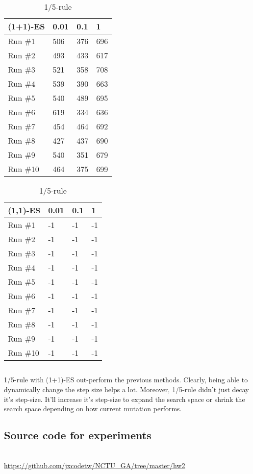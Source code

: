 \documentclass[A4]{article}
\begin{document}
\begin{table}[H]
	\begin{minipage}{.5\linewidth}
		\centering
		\begin{tabular}{@{}llll@{}}
		\toprule
		(1+1)-ES & 0.01 & 0.1 & 1   \\ \midrule
		Run \#1  & 506  & 376 & 696 \\
		Run \#2  & 493  & 433 & 617 \\
		Run \#3  & 521  & 358 & 708 \\
		Run \#4  & 539  & 390 & 663 \\
		Run \#5  & 540  & 489 & 695 \\
		Run \#6  & 619  & 334 & 636 \\
		Run \#7  & 454  & 464 & 692 \\
		Run \#8  & 427  & 437 & 690 \\
		Run \#9  & 540  & 351 & 679 \\
		Run \#10 & 464  & 375 & 699 \\ \bottomrule
		\end{tabular}
	\end{minipage}%
	\begin{minipage}{.5\linewidth}
		\begin{tabular}{@{}llll@{}}
		\toprule
		(1,1)-ES & 0.01 & 0.1 & 1  \\ \midrule
		Run \#1  & -1   & -1  & -1 \\
		Run \#2  & -1   & -1  & -1 \\
		Run \#3  & -1   & -1  & -1 \\
		Run \#4  & -1   & -1  & -1 \\
		Run \#5  & -1   & -1  & -1 \\
		Run \#6  & -1   & -1  & -1 \\
		Run \#7  & -1   & -1  & -1 \\
		Run \#8  & -1   & -1  & -1 \\
		Run \#9  & -1   & -1  & -1 \\
		Run \#10 & -1   & -1  & -1 \\ \bottomrule
		\end{tabular}
	\end{minipage}
	\caption{1/5-rule}
\end{table}



\section{}
\label{sec:p8}

1/5-rule with (1+1)-ES out-perform the previous methods.
Clearly, being able to dynamically change the step size helps a lot.
Moreover, 1/5-rule didn't just decay it's step-size.
It'll increase it's step-size to expand the search space or shrink the search space
depending on how current mutation performs.

\begin{appendices}
\chapter{Source code for experiments}\\
\url{https://github.com/jxcodetw/NCTU_GA/tree/master/hw2}
\end{appendices}
\end{document}
